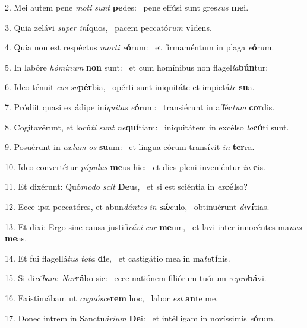 2. Mei autem pene \textit{mo}\textit{ti} \textit{sunt} \textbf{pe}des: \ast\  pene effúsi sunt gres\textit{sus} \textbf{me}i.\

3. Quia zelávi \textit{su}\textit{per} \textit{in}\textbf{í}quos, \ast\  pacem peccató\textit{rum} \textbf{vi}dens.\

4. Quia non est respéctus \textit{mor}\textit{ti} \textit{e}\textbf{ó}rum: \ast\  et firmaméntum in plaga \textit{e}\textbf{ó}rum.\

5. In labóre \textit{hó}\textit{mi}\textit{num} \textbf{non} sunt: \ast\  et cum homínibus non flagel\textit{la}\textbf{bún}tur:\

6. Ideo ténuit \textit{e}\textit{os} \textit{su}\textbf{pér}bia, \ast\  opérti sunt iniquitáte et impietá\textit{te} \textbf{su}a.\

7. Pródiit quasi ex ádipe iní\textit{qui}\textit{tas} \textit{e}\textbf{ó}rum: \ast\  transiérunt in afféc\textit{tum} \textbf{cor}dis.\

8. Cogitavérunt, et locú\textit{ti} \textit{sunt} \textit{ne}\textbf{quí}tiam: \ast\  iniquitátem in excélso \textit{lo}\textbf{cú}ti sunt.\

9. Posuérunt in \textit{cæ}\textit{lum} \textit{os} \textbf{su}um: \ast\  et lingua eórum transívit \textit{in} \textbf{ter}ra.\

10. Ideo convertétur \textit{pó}\textit{pu}\textit{lus} \textbf{me}us hic: \ast\  et dies pleni inveniéntur \textit{in} \textbf{e}is.\

11. Et dixérunt: Quó\textit{mo}\textit{do} \textit{scit} \textbf{De}us, \ast\  et si est sciéntia in \textit{ex}\textbf{cél}so?\

12. Ecce ipsi peccatóres, et abun\textit{dán}\textit{tes} \textit{in} \textbf{sǽ}culo, \ast\  obtinuérunt \textit{di}\textbf{ví}tias.\

13. Et dixi: Ergo sine causa justifi\textit{cá}\textit{vi} \textit{cor} \textbf{me}um, \ast\  et lavi inter innocéntes ma\textit{nus} \textbf{me}as.\

14. Et fui flagellá\textit{tus} \textit{to}\textit{ta} \textbf{di}e, \ast\  et castigátio mea in ma\textit{tu}\textbf{tí}nis.\

15. Si di\textit{cé}\textit{bam}: \textit{Nar}\textbf{rá}bo sic: \ast\  ecce natiónem filiórum tuórum re\textit{pro}\textbf{bá}vi.\

16. Existimábam ut \textit{co}\textit{gnó}\textit{sce}\textbf{rem} hoc, \ast\  labor \textit{est} \textbf{an}te me.\

17. Donec intrem in Sanctu\textit{á}\textit{ri}\textit{um} \textbf{De}i: \ast\  et intélligam in novíssimis \textit{e}\textbf{ó}rum.\

